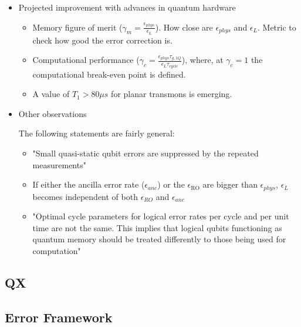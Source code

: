 \begin{itemize}
\begin{itemize}
\item Projected improvement with advances in quantum hardware
\label{sec:org27574fa}

\begin{itemize}
\item Memory figure of merit (\(\gamma_m = \frac{\epsilon_{phys}}{\epsilon_{L}}\)). How close are \(\epsilon_{phys}\) and \(\epsilon_{L}\). Metric to check how good the error correction is.

\item Computational performance (\(\gamma_c = \frac{\epsilon_{phys} \tau_{g,1Q}}{\epsilon_L \tau_{cycle}}\)), where, at \(\gamma_c = 1\) the computational break-even point is defined.

\item A value of \(T_1 > 80 \mu s\) for planar transmons is emerging.
\end{itemize}

\item Other observations
\label{sec:org2271e80}

The following statements are fairly general:

\begin{itemize}
\item "Small quasi-static qubit errors are suppressed by the repeated measurements"
\item If either the ancilla error rate (\(\epsilon_{anc}\)) or the \(\epsilon_{\text{RO}}\) are bigger than \(\epsilon_{phys}\), \(\epsilon_L\) becomes independent of both \(\epsilon_{RO}\) and \(\epsilon_{anc}\)
\item "Optimal cycle parameters for logical error rates per cycle and per unit time are not the same. This implies that logical qubits functioning as quantum memory should be treated differently to those being used for computation"
\end{itemize}
\end{itemize}
\end{itemize}

\subsection*{QX}
\label{sec:org39c888d}
\subsection*{Error Framework}
\label{sec:org41554ab}
